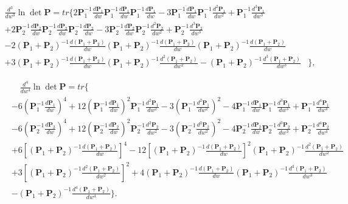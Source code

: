 \documentclass[12pt]{article}
\begin{document}
\begin{align} \label{eq:lndetP_3rdDif}
\frac{d^3}{dw^3} \ln \det \mathbf{P} = tr\{ 2 \mathbf{P}_1^{-1} \frac{d \mathbf{P}_1}{dw} \mathbf{P}_1^{-1} \frac{d \mathbf{P}_1}{dw} \mathbf{P}_1^{-1} \frac{d \mathbf{P}_1}{dw} - 3 \mathbf{P}_1^{-1} \frac{d \mathbf{P}_1}{dw} \mathbf{P}_1^{-1} \frac{d^2 \mathbf{P}_1}{d w^2} + \mathbf{P}_1^{-1} \frac{d^3 \mathbf{P}_1}{d w^3} & \nonumber \\
  + 2 \mathbf{P}_2^{-1} \frac{d \mathbf{P}_2}{dw} \mathbf{P}_2^{-1} \frac{d \mathbf{P}_2}{dw} \mathbf{P}_2^{-1} \frac{d \mathbf{P}_2}{dw} - 3 \mathbf{P}_2^{-1} \frac{d \mathbf{P}_2}{dw} \mathbf{P}_2^{-1} \frac{d^2 \mathbf{P}_2}{d w^2} + \mathbf{P}_2^{-1} \frac{d^3 \mathbf{P}_2}{d w^3} & \nonumber \\
  - 2 (\mathbf{P}_1+\mathbf{P}_2)^{-1} \frac{d (\mathbf{P}_1+\mathbf{P}_2)}{dw} (\mathbf{P}_1+\mathbf{P}_2)^{-1} \frac{d (\mathbf{P}_1+\mathbf{P}_2)}{dw} (\mathbf{P}_1+\mathbf{P}_2)^{-1} \frac{d (\mathbf{P}_1+\mathbf{P}_2)}{dw} & \nonumber \\
  + 3 (\mathbf{P}_1+\mathbf{P}_2)^{-1} \frac{d (\mathbf{P}_1+\mathbf{P}_2)}{dw} (\mathbf{P}_1+\mathbf{P}_2)^{-1} \frac{d^2 (\mathbf{P}_1+\mathbf{P}_2)}{d w^2} - (\mathbf{P}_1+\mathbf{P}_2)^{-1} \frac{d^3 (\mathbf{P}_1+\mathbf{P}_2)}{d w^3} & \},
\end{align}

\begin{align} \label{eq:lndetP_4thDif}
& \quad \frac{d^4}{dw^4} \ln \det \mathbf{P} = tr\{  \nonumber \\
& - 6 (\mathbf{P}_1^{-1} \frac{d \mathbf{P}_1}{dw})^4 + 12 (\mathbf{P}_1^{-1} \frac{d \mathbf{P}_1}{dw})^2 \mathbf{P}_1^{-1} \frac{d^2 \mathbf{P}_1}{d w^2} - 3 (\mathbf{P}_1^{-1} \frac{d^2 \mathbf{P}_1}{d w^2})^2 - 4 \mathbf{P}_1^{-1} \frac{d \mathbf{P}_1}{dw} \mathbf{P}_1^{-1} \frac{d^3 \mathbf{P}_1}{d w^3} + \mathbf{P}_1^{-1} \frac{d^4 \mathbf{P}_1}{d w^4}  \nonumber \\
& - 6 (\mathbf{P}_2^{-1} \frac{d \mathbf{P}_2}{dw})^4 + 12 (\mathbf{P}_2^{-1} \frac{d \mathbf{P}_2}{dw})^2 \mathbf{P}_2^{-1} \frac{d^2 \mathbf{P}_2}{d w^2} - 3 (\mathbf{P}_2^{-1} \frac{d^2 \mathbf{P}_2}{d w^2})^2 - 4 \mathbf{P}_2^{-1} \frac{d \mathbf{P}_2}{dw} \mathbf{P}_2^{-1} \frac{d^3 \mathbf{P}_2}{d w^3} + \mathbf{P}_2^{-1} \frac{d^4 \mathbf{P}_2}{d w^4}  \nonumber \\
& + 6 [(\mathbf{P}_1+\mathbf{P}_2)^{-1} \frac{d (\mathbf{P}_1+\mathbf{P}_2)}{dw}]^4 - 12 [(\mathbf{P}_1+\mathbf{P}_2)^{-1} \frac{d (\mathbf{P}_1+\mathbf{P}_2)}{dw}]^2 (\mathbf{P}_1+\mathbf{P}_2)^{-1} \frac{d^2 (\mathbf{P}_1+\mathbf{P}_2)}{d w^2}  \nonumber \\
& + 3 [(\mathbf{P}_1+\mathbf{P}_2)^{-1} \frac{d^2 (\mathbf{P}_1+\mathbf{P}_2)}{d w^2}]^2 + 4 (\mathbf{P}_1+\mathbf{P}_2)^{-1} \frac{d (\mathbf{P}_1+\mathbf{P}_2)}{dw} (\mathbf{P}_1+\mathbf{P}_2)^{-1} \frac{d^3 (\mathbf{P}_1+\mathbf{P}_2)}{d w^3}  \nonumber \\
& - (\mathbf{P}_1+\mathbf{P}_2)^{-1} \frac{d^4 (\mathbf{P}_1+\mathbf{P}_2)}{d w^4}\}.
\end{align}
\end{document}
